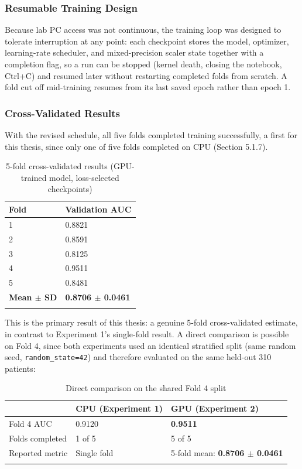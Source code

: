 \documentclass[pdflatex,sn-mathphys-num]{sn-jnl}%
\theoremstyle{thmstyleone}%
\theoremstyle{thmstyletwo}%
\theoremstyle{thmstylethree}%
\begin{document}
\subsubsection{Resumable Training Design}\label{sec5_2_4}

Because lab PC access was not continuous, the training loop was designed to tolerate interruption at any point: each checkpoint stores the model, optimizer, learning-rate scheduler, and mixed-precision scaler state together with a completion flag, so a run can be stopped (kernel death, closing the notebook, Ctrl+C) and resumed later without restarting completed folds from scratch. A fold cut off mid-training resumes from its last saved epoch rather than epoch 1.

\subsubsection{Cross-Validated Results}\label{sec5_2_5}

With the revised schedule, all five folds completed training successfully, a first for this thesis, since only one of five folds completed on CPU (Section 5.1.7).

\begin{table}[htbp]
\caption{5-fold cross-validated results (GPU-trained model, loss-selected checkpoints)}\label{tab6}
\begin{tabular}{@{}ll@{}}
\toprule
Fold & Validation AUC \\
\midrule
1 & 0.8821 \\
2 & 0.8591 \\
3 & 0.8125 \\
4 & 0.9511 \\
5 & 0.8481 \\
\textbf{Mean $\pm$ SD} & \textbf{0.8706 $\pm$ 0.0461} \\
\botrule
\end{tabular}
\end{table}
\FloatBarrier

This is the primary result of this thesis: a genuine 5-fold cross-validated estimate, in contrast to Experiment 1's single-fold result. A direct comparison is possible on Fold 4, since both experiments used an identical stratified split (same random seed, \texttt{random\_state=42}) and therefore evaluated on the same held-out 310 patients:

\begin{table}[htbp]
\caption{Direct comparison on the shared Fold 4 split}\label{tab7}
\begin{tabular}{@{}lll@{}}
\toprule
 & CPU (Experiment 1) & GPU (Experiment 2) \\
\midrule
Fold 4 AUC & 0.9120 & \textbf{0.9511} \\
Folds completed & 1 of 5 & 5 of 5 \\
Reported metric & Single fold & 5-fold mean: \textbf{0.8706 $\pm$ 0.0461} \\
\botrule
\end{tabular}
\end{table}
\FloatBarrier
\end{document}
